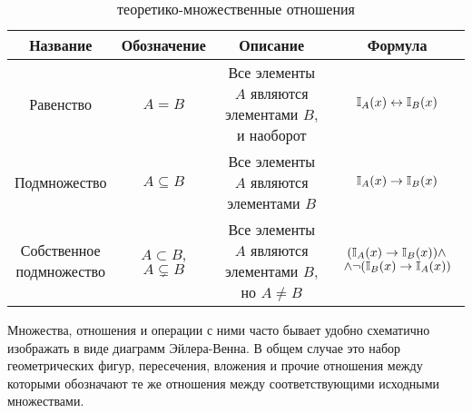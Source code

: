 \FloatBarrier

\begin{table}[ht!]
    \center
    \begin{tabular}{|c|c|c|c|}
        \hline
        Название & Обозначение & Описание & Формула \\
        \hline
        \hline
        Равенство                              & $ A = B $                              & \makecell{Все элементы $ A $ являются \\ элементами $ B $, и наоборот} & $ \mathbb{I}_A(x) \leftrightarrow \mathbb{I}_B(x) $ \\
        Подмножество                           & $ A \subseteq B $                      & \makecell{Все элементы $ A $ являются \\ элементами $ B $}             & $ \mathbb{I}_A(x) \rightarrow \mathbb{I}_B(x) $ \\
        \makecell{Собственное \\ подмножество} & $ A \subset B $, $ A \varsubsetneq B $ & \makecell{Все элементы $ A $ являются \\ элементами $ B $, но $ A \neq B $} & \makecell{$ (\mathbb{I}_{A}(x) \rightarrow \mathbb{I}_B(x)) \wedge $ \\ $ \wedge \neg (\mathbb{I}_B(x) \rightarrow \mathbb{I}_A(x)) $} \\
        \hline
    \end{tabular}
    \caption{теоретико-множественные отношения}
    \label{tab:sets:relations}
\end{table}

\FloatBarrier

Множества, отношения и операции с ними часто бывает удобно схематично изображать в виде диаграмм Эйлера-Венна.
В общем случае это набор геометрических фигур, пересечения, вложения и прочие отношения между которыми обозначают те же отношения между соответствующими исходными множествами.

